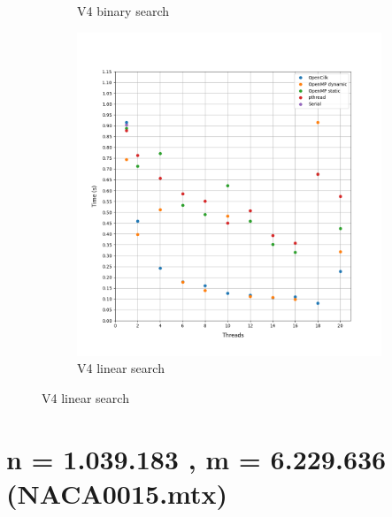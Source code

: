 \documentclass[12pt, a4paper]{article}
\begin{document}
\begin{figure}[h!]
\begin{subfigure}[b]{0.33\textwidth}
         \caption{V4 binary search}
     \end{subfigure}
     \begin{subfigure}[b]{0.33\textwidth}
         \centering
         \includegraphics[height=.4\textheight, width=\textwidth, keepaspectratio]{assets/mycielskian/v4_linear.png}
         \caption{V4 linear search} 
     \end{subfigure}
\end{figure}

\pagebreak

\section{n = 1.039.183 , m = 6.229.636 (NACA0015.mtx)}
\end{document}
